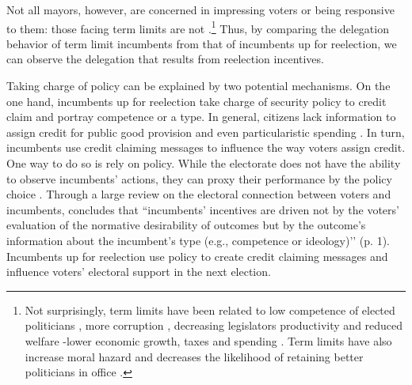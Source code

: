 Not all mayors, however, are concerned in impressing voters or being responsive to them: those facing term limits are not \citep{ashworth_2012, mayhew_1974, manin_etal_1999}.\footnote{Not surprisingly, term limits have been related to low competence of elected politicians \citep{dalbo_etal_2017}, more corruption \citep{ferraz_finan_2011}, decreasing legislators productivity \citep{hall_etal_2018} and reduced welfare -lower economic growth, taxes and spending \citep{alt_etal_2011}. Term limits have also increase moral hazard and decreases the likelihood of retaining better politicians in office \citep{smart_sturm_2013}.} Thus, by comparing the delegation behavior of term limit incumbents from that of incumbents up for reelection, we can observe the delegation that results from reelection incentives. 

Taking charge of policy can be explained by two potential mechanisms. On the one hand, incumbents up for reelection take charge of security policy to credit claim and portray competence or a type. In general, citizens lack information to assign credit for public good provision and even particularistic spending \citep{grimmer_etal_2012}. In turn, incumbents use credit claiming messages to influence the way voters assign credit. One way to do so is rely on policy. While the electorate does not have the ability to observe incumbents’ actions, they can proxy their performance by the policy choice \citep{ferejohn_1986}. Through a large review on the electoral connection between voters and incumbents, \citet{ashworth_2012} concludes that ``incumbents’ incentives are driven not by the voters’ evaluation of the normative desirability of outcomes but by the outcome’s information about the incumbent’s type (e.g., competence or ideology)’’ (p. 1). Incumbents up for reelection use policy to create credit claiming messages and influence voters’ electoral support in the next election. 


